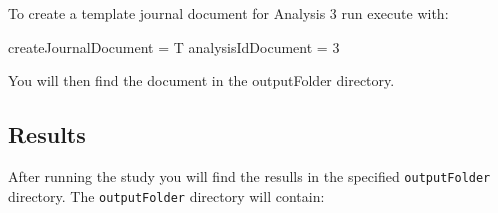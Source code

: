 \documentclass[
]{article}
\newenvironment{Shaded}{\begin{snugshade}}{\end{snugshade}}
\newcommand{\DecValTok}[1]{\textcolor[rgb]{0.00,0.00,0.81}{#1}}
\newcommand{\NormalTok}[1]{#1}
\newcommand{\StringTok}[1]{\textcolor[rgb]{0.31,0.60,0.02}{#1}}
\begin{document}
To create a template journal document for Analysis 3 run execute with:

\begin{Shaded}
\begin{Highlighting}[]
\NormalTok{    createJournalDocument =}\StringTok{ }\NormalTok{T}
\NormalTok{    analysisIdDocument =}\StringTok{ }\DecValTok{3}
\end{Highlighting}
\end{Shaded}

You will then find the document in the outputFolder directory.

\hypertarget{results}{%
\subsection{Results}\label{results}}

After running the study you will find the resulls in the specified
\texttt{outputFolder} directory. The \texttt{outputFolder} directory
will contain:
\end{document}
